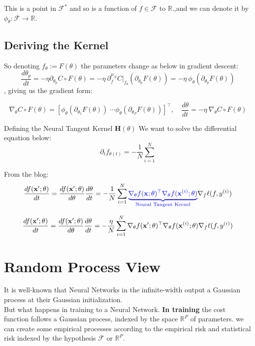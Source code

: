 \documentclass[11pt, a4paper]{article}
\theoremstyle{definition}
\theoremstyle{remark}
\newcommand{\R}{\mathbb{R}}
\newcommand{\bH}{\mathbf{H}}
\begin{document}
		This is a point in \(\mathcal{F}^*\) and so is a function of \(f \in \mathcal{F}\) to \(\R\).,and we can denote it by \(\phi_\theta:\mathcal{F}\to \R\).
	
	\subsection{Deriving the Kernel}
	So denoting \(f_\theta := F(\theta)\) the parameters change as below in gradient descent:
	\[
	\frac{d \theta_p}{dt} =  - \eta \partial_{\theta_p} C\circ F(\theta) = -\eta \ \partial^{\mu_N}_{f}C\bigr|_{f_\theta} (\partial_{\theta_p} F(\theta))  = 
- \eta \ \phi_\theta (\partial_{\theta_p} F(\theta))
	\]
, giving us the gradient form:

 \[\nabla_\theta C\circ F(\theta)  = [ \phi_\theta(\partial_{\theta_1}F(\theta)) \; \cdots \phi_\theta(\partial_{\theta_P}F(\theta)) ]^\top 
 ,\quad
 \frac{d \theta}{d t} = - \eta \ \nabla_\theta C\circ F(\theta)
 \]

Defining the Neural Tangent Kernel \(\bH(\theta)\)
We want to solve the differential equation below:
\[
\partial_{t} f_{\theta(t)} = - \frac{1}{N} \sum_{i=1}^{N} 
\]



From the blog:
	\[
\frac{df(\mathbf{x}';\theta)}{dt} 
= \frac{df(\mathbf{x}';\theta)}{d\theta}\frac{d\theta}{dt}
= -\frac{1}{N} \sum_{i=1}^N \color{blue}{\underbrace{\nabla_\theta f(\mathbf{x};\theta)^\top \nabla_\theta f(\mathbf{x}^{(i)}; \theta)}_\text{Neural Tangent Kernel}    } \color{black}{\nabla_f \ell(f, y^{(i)})}
	\]
	
	\[
	\frac{df(\mathbf{x}';\theta)}{dt} 
	= \frac{df(\mathbf{x}';\theta)}{d\theta}\frac{d\theta}{dt}
	= -\frac{\eta}{N} \sum_{i=1}^N \nabla_\theta f(\mathbf{x}';\theta)^\top \nabla_\theta f(\mathbf{x}^{(i)}; \theta) \color{black}{\nabla_f \ell(f, y^{(i)})}
	\]
	
	\section{Random Process View}
	
	It is well-known that Neural Networks in the infinite-width output a Gaussian process at their Gaussian initialization.\\
	But what happens in training to a Neural Network.
\textbf{In training} the cost function follows a Gaussian process, indexed by the space \(\R^P\) of parameters. we can create some empirical processes according to the empirical risk and statistical risk indexed by the hypothesis \(\mathcal{F}\) or \(\R^P\).
 
\end{document}
